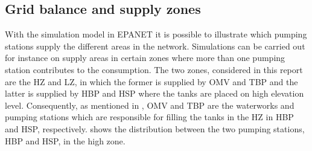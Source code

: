\vspace{-3mm}

\subsection{Grid balance and supply zones}
\label{grid_balance_supply_zones}

With the simulation model in EPANET it is possible to illustrate which pumping stations supply the different areas in the network. Simulations can be carried out for instance on supply areas in certain zones where more than one pumping station contributes to the consumption. The two zones, considered in this report are the HZ and LZ, in which the former is supplied by OMV and TBP and the latter is supplied by HBP and HSP where the tanks are placed on high elevation level. Consequently, as mentioned in , OMV and TBP are the waterworks and pumping stations which are responsible for filling the tanks in the HZ in HBP and HSP, respectively.  shows the distribution between the two pumping stations, HBP and HSP, in the high zone. 


